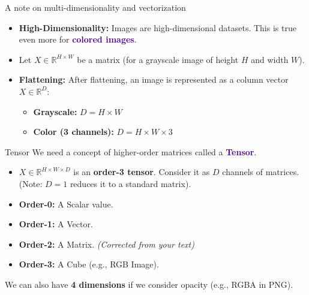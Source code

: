 \documentclass[aspectratio=169,xcolor=dvipsnames,svgnames,x11names,fleqn]{beamer}
\begin{document}
\begin{frame}[fragile]{A note on multi-dimensionality and vectorization}
    \begin{itemize}
        \item \textbf{High-Dimensionality:} Images are high-dimensional datasets. This is true even more for \textcolor{indigo}{\textbf{colored images}}.
        \item Let $X \in \mathbb{R}^{H \times W}$ be a matrix (for a grayscale image of height $H$ and width $W$).
        \item \textbf{Flattening:} After flattening, an image is represented as a column vector $X \in \mathbb{R}^{D}$:
        \begin{itemize}
            \item \textbf{Grayscale:} $D = H \times W$
            \item \textbf{Color (3 channels):} $D = H \times W \times 3$
        \end{itemize}
    \end{itemize}
    
    \begin{center}
    \end{center}
\end{frame}

\begin{frame}[fragile]{Tensor}
    We need a concept of higher-order matrices called a \textcolor{indigo}{\textbf{Tensor}}.

    \begin{itemize}
        \item $X \in \mathbb{R}^{H \times W \times D}$ is an \textbf{order-3 tensor}. Consider it as $D$ channels of matrices. (Note: $D=1$ reduces it to a standard matrix).
    \end{itemize}

    \begin{tcolorbox}[colback=indigo!5, colframe=indigo, title=Tensor Orders]
        \small
        \begin{itemize}
            \item \textbf{Order-0:} A Scalar value.
            \item \textbf{Order-1:} A Vector.
            \item \textbf{Order-2:} A Matrix. \textit{(Corrected from your text)}
            \item \textbf{Order-3:} A Cube (e.g., RGB Image).
        \end{itemize}
    \end{tcolorbox}
    \small We can also have \textbf{4 dimensions} if we consider opacity (e.g., RGBA in PNG).
\end{frame}
\end{document}
